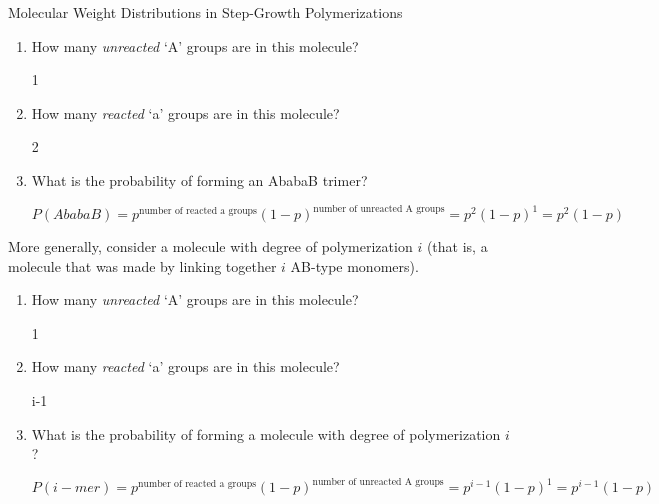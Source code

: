 \begin{activity}{Molecular Weight Distributions in Step-Growth Polymerizations}
\begin{ctqs}
\begin{enumerate}
			\item How many \emph{unreacted} `A' groups are in this molecule?
			
				\begin{solution}[0.5in]
					1
				\end{solution}
				
			\item How many \emph{reacted} `a' groups are in this molecule?
			
				\begin{solution}[0.5in]
					2
				\end{solution}
				
			\item What is the probability of forming an AbabaB trimer?
			
				\begin{solution}[0.5in]
					$P(AbabaB) = p^\text{number of reacted a groups}(1-p)^\text{number of unreacted A groups} = p^2(1-p)^1 = p^2(1-p)$
				\end{solution}
				
		\end{enumerate}
		
	\question More generally, consider a molecule with degree of polymerization $i$ (that is, a molecule that was made by linking together $i$ AB-type monomers).
	
		\begin{enumerate}
		
			\item How many \emph{unreacted} `A' groups are in this molecule?
			
				\begin{solution}[0.5in]
					1
				\end{solution}
				
			\item How many \emph{reacted} `a' groups are in this molecule?
			
				\begin{solution}[0.5in]
					i-1
				\end{solution}
				
			\item What is the probability of forming a molecule with degree of polymerization $i$?
			
				\begin{solution}[1in]
					$P(i-mer) = p^\text{number of reacted a groups}(1-p)^\text{number of unreacted A groups} = p^{i-1}(1-p)^1 = p^{i-1}(1-p)$
				\end{solution}
			

\end{enumerate}
\end{ctqs}
\end{activity}
